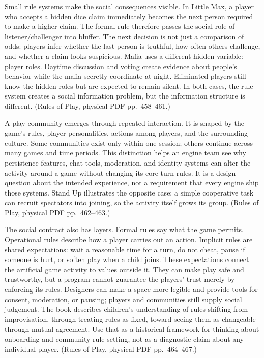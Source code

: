 Small rule systems make the social consequences visible. In Little Max, a player who accepts a hidden dice claim immediately becomes the next person required to make a higher claim. The formal rule therefore passes the social role of listener/challenger into bluffer. The next decision is not just a comparison of odds: players infer whether the last person is truthful, how often others challenge, and whether a claim looks suspicious. Mafia uses a different hidden variable: player roles. Daytime discussion and voting create evidence about people's behavior while the mafia secretly coordinate at night. Eliminated players still know the hidden roles but are expected to remain silent. In both cases, the rule system creates a social information problem, but the information structure is different. (Rules of Play, physical PDF pp.~458--461.)

A play community emerges through repeated interaction. It is shaped by the game's rules, player personalities, actions among players, and the surrounding culture. Some communities exist only within one session; others continue across many games and time periods. This distinction helps an engine team see why persistence features, chat tools, moderation, and identity systems can alter the activity around a game without changing its core turn rules. It is a design question about the intended experience, not a requirement that every engine ship those systems. Stand Up illustrates the opposite case: a simple cooperative task can recruit spectators into joining, so the activity itself grows its group. (Rules of Play, physical PDF pp.~462--463.)

The social contract also has layers. Formal rules say what the game permits. Operational rules describe how a player carries out an action. Implicit rules are shared expectations: wait a reasonable time for a turn, do not cheat, pause if someone is hurt, or soften play when a child joins. These expectations connect the artificial game activity to values outside it. They can make play safe and trustworthy, but a program cannot guarantee the players' trust merely by enforcing its rules. Designers can make a space more legible and provide tools for consent, moderation, or pausing; players and communities still supply social judgement. The book describes children's understanding of rules shifting from improvisation, through treating rules as fixed, toward seeing them as changeable through mutual agreement. Use that as a historical framework for thinking about onboarding and community rule-setting, not as a diagnostic claim about any individual player. (Rules of Play, physical PDF pp.~464--467.)

